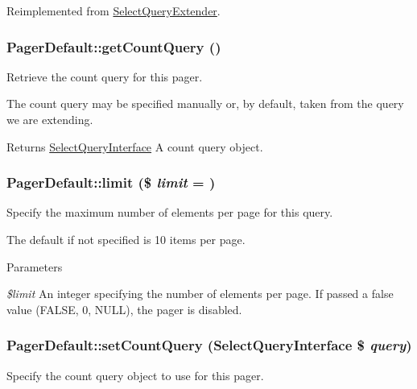 Reimplemented from \hyperlink{classSelectQueryExtender}{SelectQueryExtender}.\hypertarget{classPagerDefault_ab1fe3f648bad90c0bb9c1760fee20fed}{
\subsubsection[{getCountQuery}]{\setlength{\rightskip}{0pt plus 5cm}PagerDefault::getCountQuery ()}}
\label{classPagerDefault_ab1fe3f648bad90c0bb9c1760fee20fed}
Retrieve the count query for this pager.

The count query may be specified manually or, by default, taken from the query we are extending.

\begin{DoxyReturn}{Returns}
\hyperlink{interfaceSelectQueryInterface}{SelectQueryInterface} A count query object. 
\end{DoxyReturn}
\hypertarget{classPagerDefault_a3765bcd78bdef3da178ee071113ec28d}{
\subsubsection[{limit}]{\setlength{\rightskip}{0pt plus 5cm}PagerDefault::limit (\$ {\em limit} = {})}}
\label{classPagerDefault_a3765bcd78bdef3da178ee071113ec28d}
Specify the maximum number of elements per page for this query.

The default if not specified is 10 items per page.


\begin{DoxyParams}{Parameters}
\item[{\em \$limit}]An integer specifying the number of elements per page. If passed a false value (FALSE, 0, NULL), the pager is disabled. \end{DoxyParams}
\hypertarget{classPagerDefault_abf3bd3639cde71ae6e85c74b9fbfd42c}{
\subsubsection[{setCountQuery}]{\setlength{\rightskip}{0pt plus 5cm}PagerDefault::setCountQuery ({\bf SelectQueryInterface} \$ {\em query})}}
\label{classPagerDefault_abf3bd3639cde71ae6e85c74b9fbfd42c}
Specify the count query object to use for this pager.

